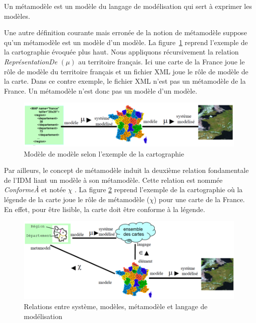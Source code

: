 \begin{definition}
Un métamodèle est un modèle du langage de modélisation qui sert à exprimer les 
modèles.
\end{definition}
Une autre définition courante mais erronée de la notion de métamodèle suppose 
qu'un métamodèle est un modèle d'un modèle. La figure~\ref{fig:modelofmodel} 
reprend l'exemple de la cartographie évoquée plus haut. Nous appliquons 
récursivement la relation \textit{ReprésentationDe} $(\mu)$ au territoire 
français. Ici une carte de la France joue le rôle de modèle du territoire 
français et un fichier XML joue le rôle de modèle de la carte. Dans ce contre 
exemple, le fichier XML n'est pas un métamodèle de la France. Un métamodèle 
n'est donc pas un modèle d'un modèle.

\begin{figure}[!htbp]
 \begin{center}
  \includegraphics[width=1\textwidth]{images/Chapitre1/modelofmodel.png}
 \end{center}
 \caption{Modèle de modèle selon l'exemple de la cartographie 
\protect\cite{favre2006ingenierie}}
 \label{fig:modelofmodel}
\end{figure}

Par ailleurs, le concept de métamodèle induit la deuxième relation fondamentale 
de l'IDM liant un modèle à son métamodèle. Cette relation est nommée 
\textit{ConformeÀ} et notée $\chi$ \cite{bezivin2004search} 
\cite{favre2004towards}. La figure \ref{fig:carteFavre} reprend l'exemple de la 
cartographie où la légende de la carte joue le rôle de métamodèle ($\chi$) pour 
une carte de la France. En effet, pour être lisible, la carte doit être conforme 
à la légende.

\begin{figure}[!htbp]
 \begin{center}
  \includegraphics[width=1\textwidth]{images/Chapitre1/cartecompleteIDM.png}
 \end{center}
 \caption{Relations entre système, modèles, métamodèle et langage de 
modélisation \protect\cite{favre2006ingenierie}}
 \label{fig:carteFavre}
\end{figure}

